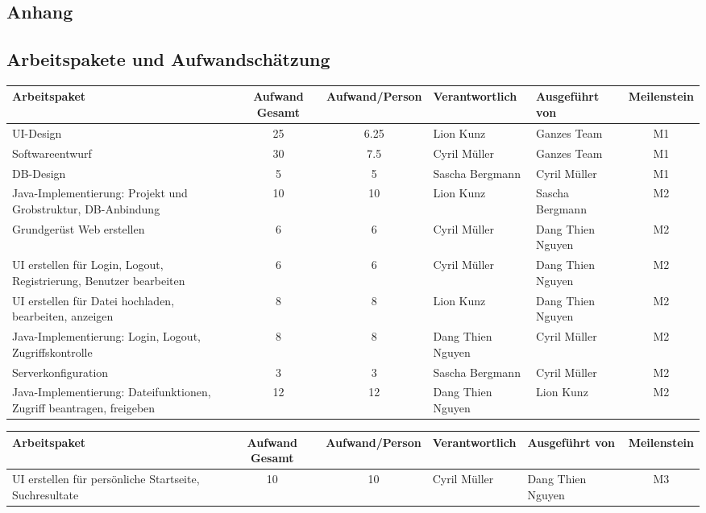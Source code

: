 \begin{landscape}
\section{Anhang}
\subsection{Arbeitspakete und Aufwandschätzung}
\label{sub:arbeitspakete_und_aufwandschaetzung}
\begin{tabularx}{\linewidth}{|X|c|c|l|l|c|} \hline
\textbf{Arbeitspaket}&	\textbf{Aufwand Gesamt}&	\textbf{Aufwand/Person}&	\textbf{Verantwortlich}&	\textbf{Ausgeführt von}&	\textbf{Meilenstein}\\ \hline
UI-Design 																&	25	&	6.25&	Lion Kunz		&	Ganzes Team&	M1\\ \hline
Softwareentwurf															&	30	&	7.5	&	Cyril Müller	&	Ganzes Team&	M1\\ \hline
DB-Design																&	5	&	5	&	Sascha Bergmann	&	Cyril Müller&	M1\\ \hline
Java-Implementierung: Projekt und Grobstruktur, DB-Anbindung			&	10	&	10	&	Lion Kunz		&	Sascha Bergmann&	M2\\ \hline
Grundgerüst Web erstellen												&	6	&	6	&	Cyril Müller	&	Dang Thien Nguyen&	M2\\ \hline
UI erstellen für Login, Logout, Registrierung, Benutzer bearbeiten		&	6	&	6	&	Cyril Müller	&	Dang Thien Nguyen&	M2\\ \hline
UI erstellen für Datei hochladen, bearbeiten, anzeigen					&	8	&	8	&	Lion Kunz		&	Dang Thien Nguyen&	M2\\ \hline
Java-Implementierung: Login, Logout, Zugriffskontrolle					&	8	&	8	&	Dang Thien Nguyen&	Cyril Müller&	M2\\ \hline
Serverkonfiguration														&	3	&	3	&	Sascha Bergmann	&	Cyril Müller&	M2\\ \hline
Java-Implementierung: Dateifunktionen, Zugriff beantragen, freigeben	&	12	&	12	&	Dang Thien Nguyen&	Lion Kunz&	M2\\ \hline
\end{tabularx}
\clearpage
\begin{tabularx}{\linewidth}{|X|c|c|l|l|c|} \hline
\textbf{Arbeitspaket}&	\textbf{Aufwand Gesamt}&	\textbf{Aufwand/Person}&	\textbf{Verantwortlich}&	\textbf{Ausgeführt von}&	\textbf{Meilenstein}\\ \hline
UI erstellen für persönliche Startseite, Suchresultate					&	10	&	10	&	Cyril Müller	&	Dang Thien Nguyen&	M3\\ \hline

\end{tabularx}
\end{landscape}

